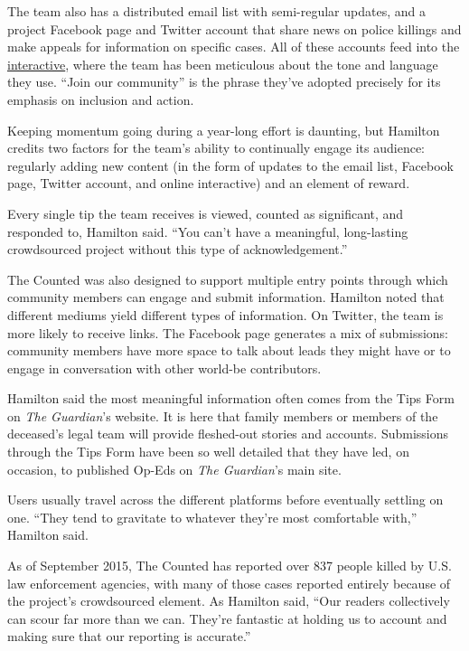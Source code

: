 \documentclass[notoc, symmetric, nobib, nols]{towcenter-guideto-book}
\begin{document}
The team also has a distributed email list with semi-regular updates, and a project Facebook page and Twitter account that share news on police killings and make appeals for information on specific cases. All of these accounts feed into the \href{http://www.theguardian.com/us-news/ng-interactive/2015/jun/01/the-counted-police-killings-us-database}{interactive},\autocite{MPExpense} where the team has been meticulous about the tone and language they use. ``Join our community'' is the phrase they've adopted precisely for its emphasis on inclusion and action. 

Keeping momentum going during a year-long effort is daunting, but Hamilton credits two factors for the team's ability to continually engage its audience: regularly adding new content (in the form of updates to the email list, Facebook page, Twitter account, and online interactive) and an element of reward. 

Every single tip the team receives is viewed, counted as significant, and responded to, Hamilton said. ``You can't have a meaningful, long-lasting crowdsourced project without this type of acknowledgement.''

The Counted was also designed to support multiple entry points through which community members can engage and submit information.
Hamilton noted that different mediums yield different types of information. On Twitter, the team is more likely to receive links. The Facebook page generates a mix of submissions: community members have more space to talk about leads they might have or to engage in conversation with other world-be contributors.

Hamilton said the most meaningful information often comes from the Tips Form on \textit{The Guardian}'s website. It is here that family members or members of the deceased's legal team will provide fleshed-out stories and accounts. Submissions through the Tips Form have been so well detailed that they have led, on occasion, to published Op-Eds on \textit{The Guardian}'s main site.

Users usually travel across the different platforms before eventually settling on one. ``They tend to gravitate to whatever they're most comfortable with,'' Hamilton said.

As of September 2015, The Counted has reported over 837 people killed by U.S. law enforcement agencies, with many of those cases reported entirely because of the project's crowdsourced element. As Hamilton said, ``Our readers collectively can scour far more than we can. They're fantastic at holding us to account and making sure that our reporting is accurate.'' 
\end{document}
